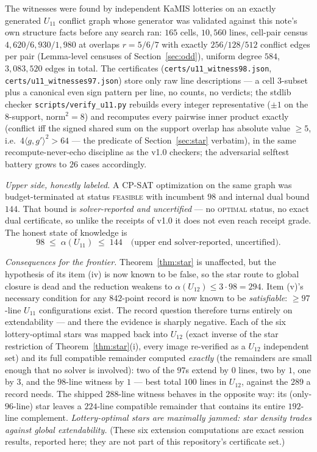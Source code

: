 \documentclass[11pt]{article}
\theoremstyle{remark}
\begin{document}
The witnesses were found by independent KaMIS lotteries on an exactly
generated $U_{11}$ conflict graph whose generator was validated against
this note's own structure facts before any search ran: $165$ cells,
$10{,}560$ lines, cell-pair census $4{,}620/6{,}930/1{,}980$ at overlaps
$r=5/6/7$ with exactly $256/128/512$ conflict edges per pair
(Lemma-level censuses of Section~\ref{sec:odd}), uniform degree $584$,
$3{,}083{,}520$ edges in total. The certificates
(\texttt{certs/u11\_witness98.json}, \texttt{certs/u11\_witnesses97.json})
store only raw line descriptions --- a cell $3$-subset plus a canonical
even sign pattern per line, no counts, no verdicts; the stdlib checker
\texttt{scripts/verify\_u11.py} rebuilds every integer representative
($\pm1$ on the $8$-support, norm$^2=8$) and recomputes every pairwise
inner product exactly (conflict iff the signed shared sum on the support
overlap has absolute value $\ge5$, i.e.\ $4\langle g,g'\rangle^2>64$ ---
the predicate of Section~\ref{sec:star} verbatim), in the same
recompute-never-echo discipline as the v1.0 checkers; the adversarial
selftest battery grows to $26$ cases accordingly.

\emph{Upper side, honestly labeled.} A CP-SAT optimization on the same
graph was budget-terminated at status \textsc{feasible} with incumbent
$98$ and internal dual bound $144$. That bound is \emph{solver-reported
and uncertified} --- no \textsc{optimal} status, no exact dual
certificate, so unlike the receipts of v1.0 it does not even reach
receipt grade. The honest state of knowledge is
\[
98\;\le\;\alpha(U_{11})\;\le\;144\quad\text{(upper end solver-reported,
uncertified)}.
\]

\emph{Consequences for the frontier.} Theorem~\ref{thm:star} is
unaffected, but the hypothesis of its item (iv) is now known to be false,
so the star route to global closure is dead and the reduction weakens to
$\alpha(U_{12})\le3\cdot98=294$. Item (v)'s necessary condition for any
$842$-point record is now known to be \emph{satisfiable}: $\ge97$-line
$U_{11}$ configurations exist. The record question therefore turns
entirely on extendability --- and there the evidence is sharply negative.
Each of the six lottery-optimal stars was mapped back into $U_{12}$
(exact inverse of the star restriction of Theorem~\ref{thm:star}(i),
every image re-verified as a $U_{12}$ independent set) and its full
compatible remainder computed \emph{exactly} (the remainders are small
enough that no solver is involved): two of the $97$s extend by $0$ lines,
two by $1$, one by $3$, and the $98$-line witness by $1$ --- best total
$100$ lines in $U_{12}$, against the $289$ a record needs. The shipped
$288$-line witness behaves in the opposite way: its (only-$96$-line)
star leaves a $224$-line compatible remainder that contains its entire
$192$-line complement. \emph{Lottery-optimal stars are maximally jammed:
star density trades against global extendability.} (These six extension
computations are exact session results, reported here; they are not part
of this repository's certificate set.)
\end{document}
